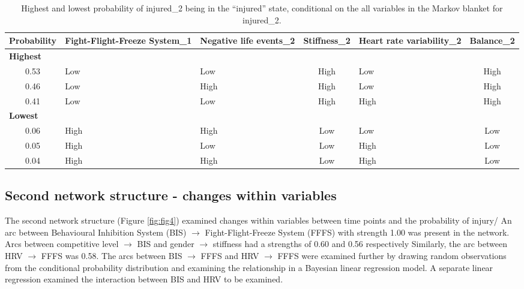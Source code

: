 \documentclass[
  english,
  man]{apa6}
\begin{document}
\begin{table}[H]

\caption{\label{tab:table7}Highest and lowest probability of injured\_2 being in the ``injured'' state, conditional on the all variables in the Markov blanket for injured\_2.}
\centering
\fontsize{11}{13}\selectfont
\begin{tabular}[t]{c|>{\centering\arraybackslash}p{2cm}|>{\centering\arraybackslash}p{2cm}|c|>{\centering\arraybackslash}p{2.8cm}|c}
\hline
\textbf{Probability} & \textbf{Fight-Flight-Freeze System\_1} & \textbf{Negative life events\_2 } & \textbf{Stiffness\_2} & \textbf{Heart rate variability\_2} & \textbf{Balance\_2}\\
\hline
\multicolumn{6}{l}{\textbf{Highest}}\\
\hline
\hspace{1em}0.53 & Low & Low & High & Low & High\\
\hline
\hspace{1em}0.46 & Low & High & High & Low & High\\
\hline
\hspace{1em}0.41 & Low & Low & High & High & High\\
\hline
\multicolumn{6}{l}{\textbf{Lowest}}\\
\hline
\hspace{1em}0.06 & High & High & Low & Low & Low\\
\hline
\hspace{1em}0.05 & High & Low & Low & High & Low\\
\hline
\hspace{1em}0.04 & High & High & Low & High & Low\\
\hline
\end{tabular}
\end{table}

\hypertarget{second-network-structure---changes-within-variables}{%
\subsection{Second network structure - changes within variables}\label{second-network-structure---changes-within-variables}}

The second network structure (Figure \ref{fig:fig4}) examined changes within variables between time points and the probability of injury/ An arc between Behavioural Inhibition System (BIS) \(\rightarrow\) Fight-Flight-Freeze System (FFFS) with strength 1.00 was present in the network.
Arcs between competitive level \(\rightarrow\) BIS and gender \(\rightarrow\) stiffness had a strengths of 0.60 and 0.56 respectively Similarly, the arc between HRV \(\rightarrow\) FFFS was 0.58.
The arcs between BIS \(\rightarrow\) FFFS and HRV \(\rightarrow\) FFFS were examined further by drawing random observations from the conditional probability distribution and examining the relationship in a Bayesian linear regression model.
A separate linear regression examined the interaction between BIS and HRV to be examined.
\end{document}
